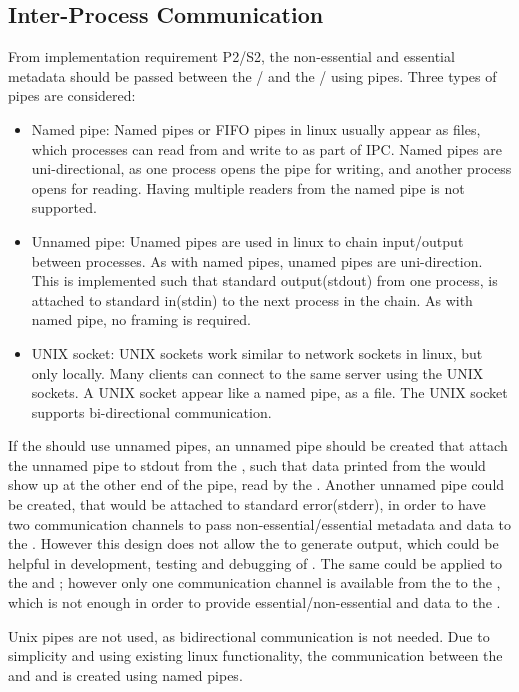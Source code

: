 \subsection{Inter-Process Communication} \label{sec:implementation:ipc}
From implementation requirement P2/S2, the non-essential and essential metadata should be passed between the \pub{}/\sub{} and the \con{}/\pro{} using pipes. Three types of pipes are considered:
\begin{itemize}
	\item Named pipe: Named pipes or FIFO pipes in linux usually appear as files, which processes can read from and write to as part of \ac{IPC}. Named pipes are uni-directional, as one process opens the pipe for writing, and another process opens for reading. Having multiple readers from the named pipe is not supported.
	
	\item Unnamed pipe: Unamed pipes are used in linux to chain input/output between processes. As with named pipes, unamed pipes are uni-direction. This is implemented such that standard output(stdout) from one process, is attached to standard in(stdin) to the next process in the chain. As with named pipe, no framing is required.
	
	\item UNIX socket: UNIX sockets work similar to network sockets in linux, but only locally. Many clients can connect to the same server using the UNIX sockets. A UNIX socket appear like a named pipe, as a file. The UNIX socket supports bi-directional communication. 
\end{itemize}

If the \pub{} should use unnamed pipes, an unnamed pipe should be created that attach the unnamed pipe to stdout from the \pro{}, such that data printed from the \pro{} would show up at the other end of the pipe, read by the \pub{}. Another unnamed pipe could be created, that would be attached to standard error(stderr), in order to have two communication channels to pass non-essential/essential metadata and data to the \pub{}. However this design does not allow the \pro{} to generate output, which could be helpful in development, testing and debugging of \cons{}. The same could be applied to the \sub{} and \con{}; however only one communication channel is available from the \sub{} to the \con{}, which is not enough in order to provide essential/non-essential and data to the \con{}.

Unix pipes are not used, as bidirectional communication is not needed. Due to simplicity and using existing linux functionality, the communication between the \pubs{} \subs{} and \con{} and \pro{} is created using named pipes. 


